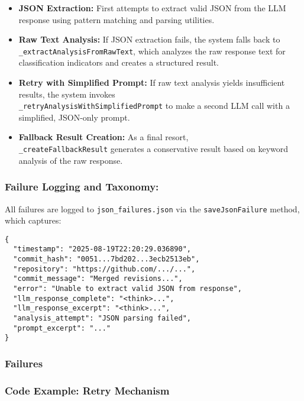 \begin{itemize}
    \item \textbf{JSON Extraction:} First attempts to extract valid JSON from the LLM response using pattern matching and parsing utilities.
    \item \textbf{Raw Text Analysis:} If JSON extraction fails, the system falls back to \texttt{\_extractAnalysisFromRawText}, which analyzes the raw response text for classification indicators and creates a structured result.
    \item \textbf{Retry with Simplified Prompt:} If raw text analysis yields insufficient results, the system invokes \\ \texttt{\_retryAnalysisWithSimplifiedPrompt} to make a second LLM call with a simplified, JSON-only prompt.
    \item \textbf{Fallback Result Creation:} As a final resort,\\ \texttt{\_createFallbackResult} generates a conservative result based on keyword analysis of the raw response.
\end{itemize}


\subsubsection{Failure Logging and Taxonomy: }

All failures are logged to \texttt{json\_failures.json} via the \texttt{saveJsonFailure} method, which captures:

\begin{verbatim}
{
  "timestamp": "2025-08-19T22:20:29.036890",
  "commit_hash": "0051...7bd202...3ecb2513eb",
  "repository": "https://github.com/.../...",
  "commit_message": "Merged revisions...",
  "error": "Unable to extract valid JSON from response",
  "llm_response_complete": "<think>...",
  "llm_response_excerpt": "<think>...",
  "analysis_attempt": "JSON parsing failed",
  "prompt_excerpt": "..."
}
\end{verbatim}

\subsubsection{Failures}


\subsubsection{Code Example: Retry Mechanism}

